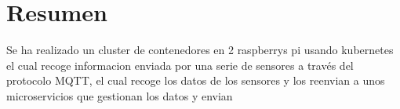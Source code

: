 \documentclass[a4paper,12pt]{book}
\begin{document}
\section{Resumen}
Se ha realizado un cluster de contenedores en 2 raspberrys pi usando kubernetes el cual recoge informacion enviada por una serie de sensores a través del protocolo MQTT, el cual recoge los datos de los sensores y los reenvian a unos microservicios que gestionan los datos y envian 
\end{document}
